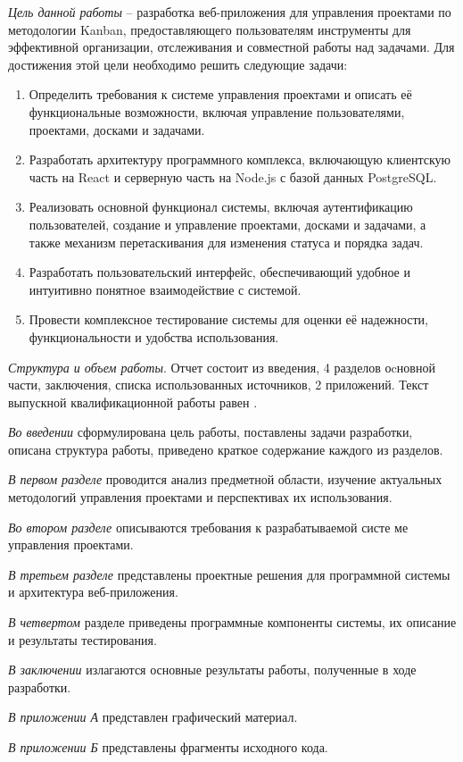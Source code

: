 \textit{Цель данной работы} -- разработка веб-приложения для управления проектами по методологии Kanban, предоставляющего пользователям инструменты для эффективной организации, отслеживания и совместной работы над задачами. Для достижения этой цели необходимо решить следующие задачи:
\begin{enumerate}
	\item Определить требования к системе управления проектами и описать её функциональные возможности, включая управление пользователями, проектами, досками и задачами.
	\item Разработать архитектуру программного комплекса, включающую клиентскую часть на React и серверную часть на Node.js с базой данных PostgreSQL.
	\item Реализовать основной функционал системы, включая аутентификацию пользователей, создание и управление проектами, досками и задачами, а также механизм перетаскивания для изменения статуса и порядка задач.
	\item Разработать пользовательский интерфейс, обеспечивающий удобное и интуитивно понятное взаимодействие с системой.
	\item Провести комплексное тестирование системы для оценки её надежности, функциональности и удобства использования.
\end{enumerate}

\textit{Структура и объем работы}. Отчет состоит из введения, 4 разделов оcновной части, заключения, списка использованных источников, 2 приложений. Текст выпускной квалификационной работы равен .

\textit{Во введении} сформулирована цель работы, поставлены задачи разработки, описана структура работы, приведено краткое содержание каждого из
разделов.

\textit{В первом разделе} проводится анализ предметной области, изучение актуальных методологий управления проектами и перспективах их использования.

\textit{Во втором разделе} описываются требования к разрабатываемой систе
ме управления проектами.

\textit{В третьем разделе} представлены проектные решения для программной системы и архитектура веб-приложения.

\textit{В четвертом} разделе приведены программные компоненты системы,
их описание и результаты тестирования.

\textit{В заключении} излагаются основные результаты работы, полученные в
ходе разработки.

\textit{В приложении А} представлен графический материал.

\textit{В приложении Б} представлены фрагменты исходного кода.